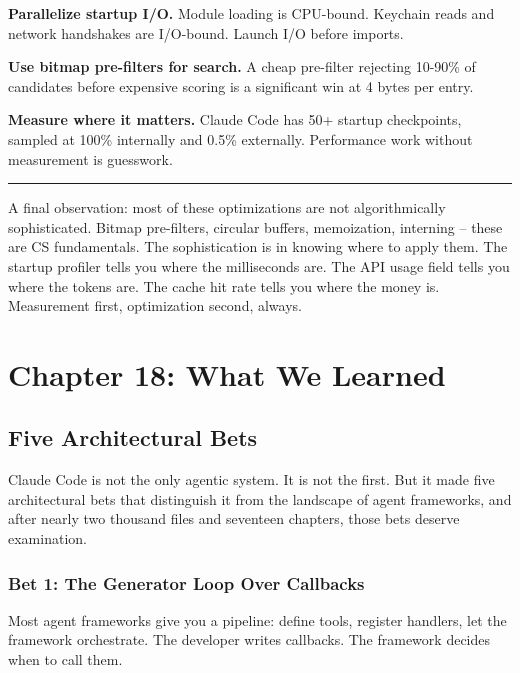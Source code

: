 \documentclass[
  english,
  11pt,
  letterpaper,
]{book}
\begin{document}
\textbf{Parallelize startup I/O.} Module loading is CPU-bound. Keychain
reads and network handshakes are I/O-bound. Launch I/O before imports.

\textbf{Use bitmap pre-filters for search.} A cheap pre-filter rejecting
10-90\% of candidates before expensive scoring is a significant win at 4
bytes per entry.

\textbf{Measure where it matters.} Claude Code has 50+ startup
checkpoints, sampled at 100\% internally and 0.5\% externally.
Performance work without measurement is guesswork.

\begin{center}\rule{0.5\linewidth}{0.5pt}\end{center}

A final observation: most of these optimizations are not algorithmically
sophisticated. Bitmap pre-filters, circular buffers, memoization,
interning -- these are CS fundamentals. The sophistication is in knowing
where to apply them. The startup profiler tells you where the
milliseconds are. The API usage field tells you where the tokens are.
The cache hit rate tells you where the money is. Measurement first,
optimization second, always.

\chapter{Chapter 18: What We Learned}\label{chapter-18-what-we-learned}

\section{Five Architectural Bets}\label{five-architectural-bets}

Claude Code is not the only agentic system. It is not the first. But it
made five architectural bets that distinguish it from the landscape of
agent frameworks, and after nearly two thousand files and seventeen
chapters, those bets deserve examination.

\subsection{Bet 1: The Generator Loop Over
Callbacks}\label{bet-1-the-generator-loop-over-callbacks}

Most agent frameworks give you a pipeline: define tools, register
handlers, let the framework orchestrate. The developer writes callbacks.
The framework decides when to call them.
\end{document}
